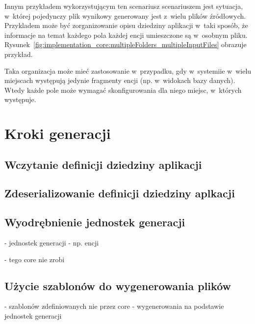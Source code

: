Innym przykładem wykorzystującym ten scenariusz scenariuszem jest sytuacja, w~której pojedynczy plik wynikowy generowany jest z~wielu plików źródłowych.
Przykladem może być zorganizowanie opisu dziedziny aplikacji w~taki sposób, że informacje na temat każdego pola każdej encji umieszczone są w~osobnym pliku.
Rysunek~\ref{fig:implementation_core:multipleFolders_multipleInputFiles} obrazuje przykład.



Taka organizacja może mieć zastosowanie w~przypadku, gdy w~systemiie w~wielu miejscach występują jedynie fragmenty encji (np. w~widokach bazy danych).
Wtedy każde pole może wymagać skonfigurowania dla niego miejsc, w~których występuje.



\section{Kroki generacji}

\subsection{Wczytanie definicji dziedziny aplikacji}


\subsection{Zdeserializowanie definicji dziedziny aplkacji}


\subsection{Wyodrębnienie jednostek generacji}

- jednostek generacji - np. encji

- tego core nie zrobi


\subsection{Użycie szablonów do wygenerowania plików}

- szablonów zdefiniowanych nie przez core
- wygenerowania na podstawie jednostek generacji
